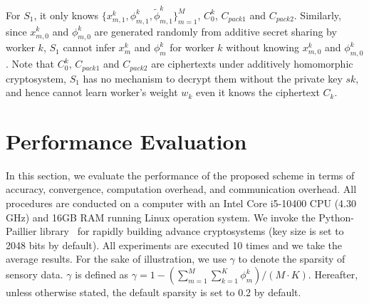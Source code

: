 \documentclass[conference]{IEEEtran}
\begin{document}
For $S_1$, it only knows $\{x_{m,1}^k, \phi_{m,1}^k, \tilde{\phi}_{m,1}^k\}_{m=1}^M$, $C_0^k$, $C_{pack1}$ and $C_{pack2}$.
Similarly, since $x_{m,0}^k$ and $\phi_{m,0}^k$ are generated randomly from additive secret sharing by worker $k$, $S_1$ cannot infer $x_m^k$ and $\phi_m^k$ for worker $k$ without knowing $x_{m,0}^k$ and $\phi_{m,0}^k$.
Note that $C_0^k$, $C_{pack1}$ and $C_{pack2}$ are ciphertexts under additively homomorphic cryptosystem, $S_1$ has no mechanism to decrypt them without the private key $sk$, and hence cannot learn worker's weight $w_k$ even it knows the ciphertext $C_k$.

\section{Performance Evaluation}\label{sec7}
In this section, we evaluate the performance of the proposed scheme in terms of accuracy, convergence, computation overhead, and communication overhead.
All procedures are conducted on a computer with an Intel Core i5-10400 CPU (4.30 GHz) and 16GB RAM running Linux operation system.
We invoke the Python-Paillier library~\cite{PythonPaillier} for rapidly building advance cryptosystems (key size is set to 2048 bits by default).
All experiments are executed 10 times and we take the average results.
For the sake of illustration, we use $\gamma$ to denote the sparsity of sensory data.
$\gamma$ is defined as $\gamma = 1 - (\sum\limits_{m=1}^M\sum\limits_{k=1}^K\phi_m^k) / (M\cdot K)$.
Hereafter, unless otherwise stated, the default sparsity is set to 0.2 by default.
\end{document}

